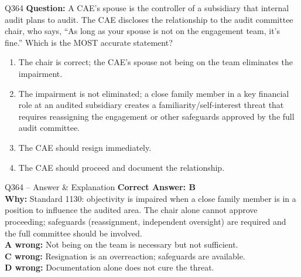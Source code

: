 \documentclass[aspectratio=169,10pt]{beamer}
\begin{document}
	\begin{frame}[t]{Q364}
		\small
		\textbf{Question:} A CAE's spouse is the controller of a subsidiary that internal audit plans to audit. The CAE discloses the relationship to the audit committee chair, who says, ``As long as your spouse is not on the engagement team, it's fine.'' Which is the MOST accurate statement?
		\begin{enumerate}[label=\Alph*.,itemsep=1pt,topsep=2pt]
			\item The chair is correct; the CAE's spouse not being on the team eliminates the impairment.
			\item The impairment is not eliminated; a close family member in a key financial role at an audited subsidiary creates a familiarity/self-interest threat that requires reassigning the engagement or other safeguards approved by the full audit committee.
			\item The CAE should resign immediately.
			\item The CAE should proceed and document the relationship.
		\end{enumerate}
	\end{frame}
	
	\begin{frame}[t]{Q364 -- Answer \& Explanation}
		\small
		\textbf{Correct Answer: B} \\[4pt]
		\textbf{Why:} Standard 1130: objectivity is impaired when a close family member is in a position to influence the audited area. The chair alone cannot approve proceeding; safeguards (reassignment, independent oversight) are required and the full committee should be involved. \\[4pt]
		\textbf{A wrong:} Not being on the team is necessary but not sufficient. \\[2pt]
		\textbf{C wrong:} Resignation is an overreaction; safeguards are available. \\[2pt]
		\textbf{D wrong:} Documentation alone does not cure the threat.
	\end{frame}
	
\end{document}
